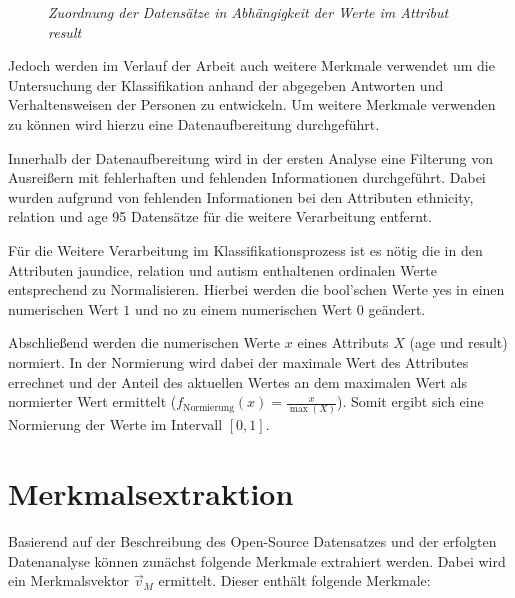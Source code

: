 \documentclass[conference]{IEEEtran}
\begin{document}
\begin{figure}[h!]
\centering

\label{fig:result_classification}
\caption{\em Zuordnung der Datensätze in Abhängigkeit der Werte im Attribut \textit{result}}
\end{figure}

Jedoch werden im Verlauf der Arbeit auch weitere Merkmale verwendet um die Untersuchung der Klassifikation anhand der abgegeben Antworten und Verhaltensweisen der Personen zu entwickeln. Um weitere Merkmale verwenden zu können wird hierzu eine Datenaufbereitung durchgeführt.

Innerhalb der Datenaufbereitung wird in der ersten Analyse eine Filterung von Ausreißern mit fehlerhaften und fehlenden Informationen durchgeführt. Dabei wurden aufgrund von fehlenden Informationen bei den Attributen \glqq ethnicity\grqq, \glqq relation\grqq{} und \glqq age\grqq{} 95 Datensätze für die weitere Verarbeitung entfernt.

Für die Weitere Verarbeitung im Klassifikationsprozess ist es nötig die in den Attributen \glqq jaundice\grqq, \glqq relation\grqq{} und \glqq autism\grqq {} enthaltenen ordinalen Werte entsprechend zu Normalisieren. Hierbei werden die bool'schen Werte \glqq yes\grqq{} in einen numerischen Wert $1$ und \glqq no\grqq{} zu einem numerischen Wert $0$ geändert.

Abschließend werden die numerischen Werte $x$ eines Attributs $X$ (\glqq age\grqq{} und \glqq result\grqq{}) normiert. In der Normierung wird dabei der maximale Wert des Attributes errechnet und der Anteil des aktuellen Wertes an dem maximalen Wert als normierter Wert ermittelt ($f_{\text{Normierung}}(x) = \frac{x}{\max(X)}$). Somit ergibt sich eine Normierung der Werte im Intervall $[0,1]$.

\section{Merkmalsextraktion}
Basierend auf der Beschreibung des Open-Source Datensatzes und der erfolgten Datenanalyse können zunächst folgende Merkmale extrahiert werden. Dabei wird ein Merkmalsvektor $\vec{v}_M$ ermittelt. Dieser enthält folgende Merkmale:
\end{document}
